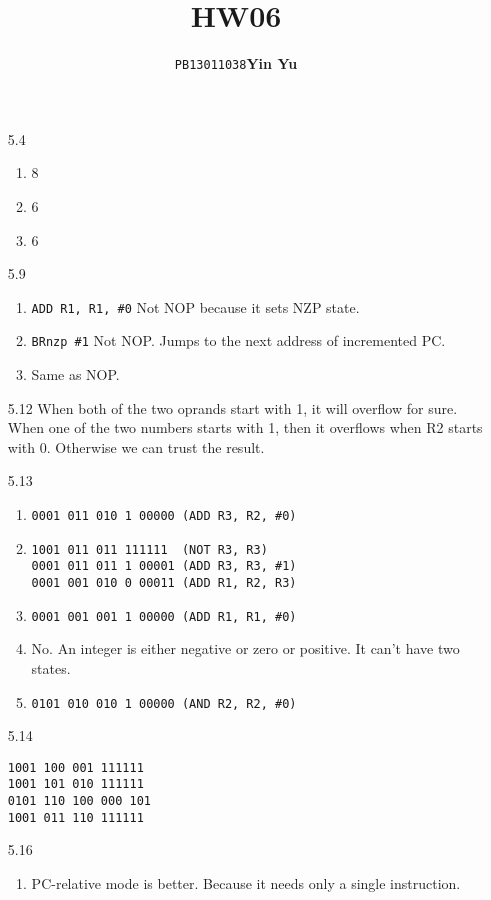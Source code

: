 \documentclass[a4paper]{article}
\title{\textbf{HW06}}
\author{\texttt{PB13011038}\quad\textbf{Yin Yu}}
\date{}
\begin{document}
\maketitle

\begin{enumerate}
\item[5.4]
  \begin{enumerate}
  \item 8
  \item 6
  \item 6
  \end{enumerate}
\item[5.9]
  \begin{enumerate}
  \item \verb+ADD R1, R1, #0+ Not NOP because it sets NZP state.
  \item \verb+BRnzp #1+ Not NOP. Jumps to the next address of
    incremented PC.
  \item Same as NOP.
  \end{enumerate}
\item[5.12] When both of the two oprands start with 1, it will
  overflow for sure. When one of the two numbers starts with 1, then
  it overflows when R2 starts with 0. Otherwise we can trust the result.
\item[5.13]
  \begin{enumerate}
  \item \verb+0001 011 010 1 00000 (ADD R3, R2, #0)+
  \item
\begin{verbatim}
1001 011 011 111111  (NOT R3, R3)
0001 011 011 1 00001 (ADD R3, R3, #1)
0001 001 010 0 00011 (ADD R1, R2, R3)
\end{verbatim}
  \item \verb+0001 001 001 1 00000 (ADD R1, R1, #0)+
  \item No. An integer is either negative or zero or positive. It
    can't have two states.
  \item \verb+0101 010 010 1 00000 (AND R2, R2, #0)+
  \end{enumerate}
\item[5.14]
\begin{verbatim}
1001 100 001 111111
1001 101 010 111111
0101 110 100 000 101
1001 011 110 111111
\end{verbatim}
\item[5.16] 
\begin{enumerate}
\item PC-relative mode is better. Because it needs only a single instruction.

\end{enumerate}
\end{enumerate}
\end{document}
